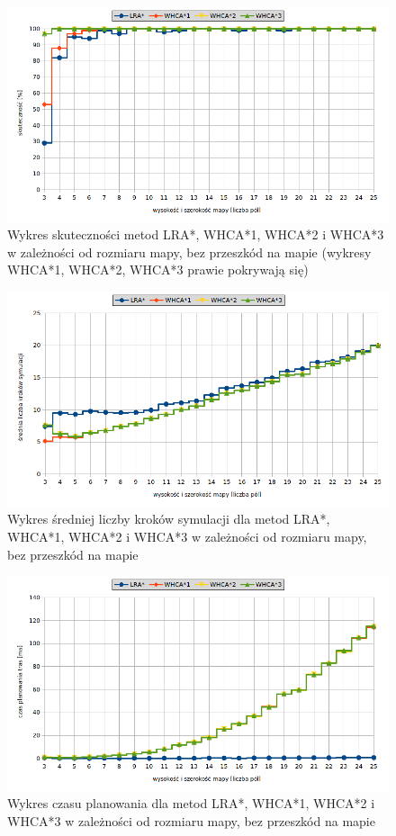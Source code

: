 \begin{figure}[H]
	\centering
	\includegraphics[width=0.9\columnwidth]{img/plots/test-steps-empty-mapsize-eff}
	\caption{Wykres skuteczności metod LRA*, WHCA*1, WHCA*2 i WHCA*3 w zależności od rozmiaru mapy, bez przeszkód na mapie (wykresy WHCA*1, WHCA*2, WHCA*3 prawie pokrywają się)}
	\label{fig:test-steps-empty-mapsize-eff}
\end{figure}
\begin{figure}[H]
	\centering
	\includegraphics[width=0.9\columnwidth]{img/plots/test-steps-empty-mapsize-steps}
	\caption{Wykres średniej liczby kroków symulacji dla metod LRA*, WHCA*1, WHCA*2 i WHCA*3 w zależności od rozmiaru mapy, bez przeszkód na mapie}
	\label{fig:test-steps-empty-mapsize-steps}
\end{figure}
\begin{figure}[H]
	\centering
	\includegraphics[width=0.9\columnwidth]{img/plots/test-steps-empty-mapsize-calctime}
	\caption{Wykres czasu planowania dla metod LRA*, WHCA*1, WHCA*2 i WHCA*3 w zależności od rozmiaru mapy, bez przeszkód na mapie}
	\label{fig:test-steps-empty-mapsize-calctime}
\end{figure}


